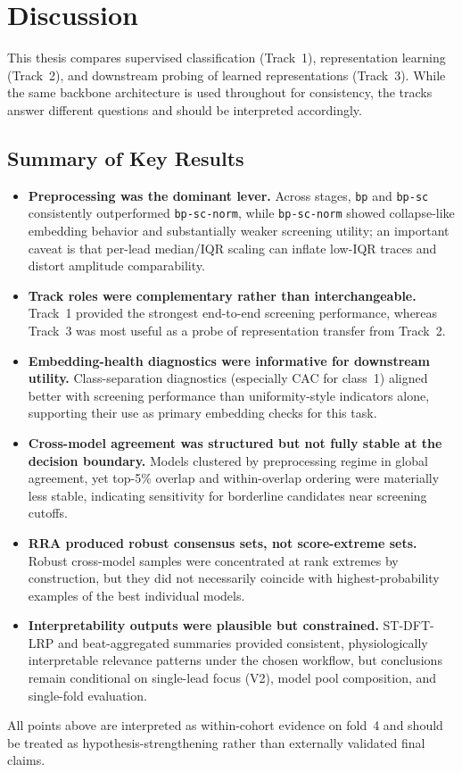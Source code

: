 \chapter{Discussion}
\label{ch:discussion}

This thesis compares supervised classification (Track~1), representation learning (Track~2), and downstream probing of learned representations (Track~3).
While the same backbone architecture is used throughout for consistency, the tracks answer different questions and should be interpreted accordingly.

\section{Summary of Key Results}
\begin{itemize}
  \item \textbf{Preprocessing was the dominant lever.} Across stages, \texttt{bp} and \texttt{bp-sc} consistently outperformed \texttt{bp-sc-norm}, while \texttt{bp-sc-norm} showed collapse-like embedding behavior and substantially weaker screening utility; an important caveat is that per-lead median/IQR scaling can inflate low-IQR traces and distort amplitude comparability.
  \item \textbf{Track roles were complementary rather than interchangeable.} Track~1 provided the strongest end-to-end screening performance, whereas Track~3 was most useful as a probe of representation transfer from Track~2.
  \item \textbf{Embedding-health diagnostics were informative for downstream utility.} Class-separation diagnostics (especially CAC for class~1) aligned better with screening performance than uniformity-style indicators alone, supporting their use as primary embedding checks for this task.
  \item \textbf{Cross-model agreement was structured but not fully stable at the decision boundary.} Models clustered by preprocessing regime in global agreement, yet top-5\% overlap and within-overlap ordering were materially less stable, indicating sensitivity for borderline candidates near screening cutoffs.
  \item \textbf{RRA produced robust consensus sets, not score-extreme sets.} Robust cross-model samples were concentrated at rank extremes by construction, but they did not necessarily coincide with highest-probability examples of the best individual models.
  \item \textbf{Interpretability outputs were plausible but constrained.} ST-DFT-LRP and beat-aggregated summaries provided consistent, physiologically interpretable relevance patterns under the chosen workflow, but conclusions remain conditional on single-lead focus (V2), model pool composition, and single-fold evaluation.
\end{itemize}
All points above are interpreted as within-cohort evidence on fold~4 and should be treated as hypothesis-strengthening rather than externally validated final claims.

